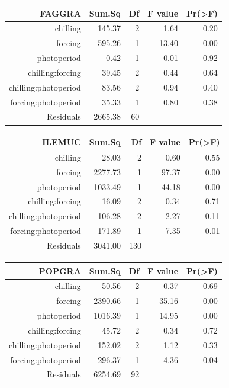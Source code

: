 \documentclass{article}\usepackage[]{graphicx}\usepackage[]{color}
\begin{document}
\begin{table}[ht]
\centering
\begin{tabular}{rrrrr}
  \hline
  FAGGRA & Sum.Sq & Df & F value & Pr(>F) \\
 \hline
chilling & 145.37 &   2 & 1.64 & 0.20 \\ 
  forcing & 595.26 &   1 & 13.40 & 0.00 \\ 
  photoperiod & 0.42 &   1 & 0.01 & 0.92 \\ 
  chilling:forcing & 39.45 &   2 & 0.44 & 0.64 \\ 
  chilling:photoperiod & 83.56 &   2 & 0.94 & 0.40 \\ 
  forcing:photoperiod & 35.33 &   1 & 0.80 & 0.38 \\ 
  Residuals & 2665.38 &  60 &  &  \\ 
   \hline
\end{tabular}
\end{table}
\begin{table}[ht]
\centering
\begin{tabular}{rrrrr}
  \hline
  ILEMUC & Sum.Sq & Df & F value & Pr(>F) \\
 \hline
chilling & 28.03 &   2 & 0.60 & 0.55 \\ 
  forcing & 2277.73 &   1 & 97.37 & 0.00 \\ 
  photoperiod & 1033.49 &   1 & 44.18 & 0.00 \\ 
  chilling:forcing & 16.09 &   2 & 0.34 & 0.71 \\ 
  chilling:photoperiod & 106.28 &   2 & 2.27 & 0.11 \\ 
  forcing:photoperiod & 171.89 &   1 & 7.35 & 0.01 \\ 
  Residuals & 3041.00 & 130 &  &  \\ 
   \hline
\end{tabular}
\end{table}
\begin{table}[ht]
\centering
\begin{tabular}{rrrrr}
  \hline
  POPGRA & Sum.Sq & Df & F value & Pr(>F) \\
 \hline
chilling & 50.56 &   2 & 0.37 & 0.69 \\ 
  forcing & 2390.66 &   1 & 35.16 & 0.00 \\ 
  photoperiod & 1016.39 &   1 & 14.95 & 0.00 \\ 
  chilling:forcing & 45.72 &   2 & 0.34 & 0.72 \\ 
  chilling:photoperiod & 152.02 &   2 & 1.12 & 0.33 \\ 
  forcing:photoperiod & 296.37 &   1 & 4.36 & 0.04 \\ 
  Residuals & 6254.69 &  92 &  &  \\ 
   \hline
\end{tabular}
\end{table}
\end{document}
